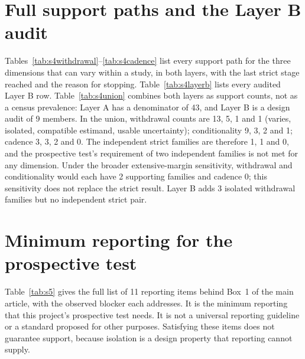 \documentclass[11pt]{article}
\begin{document}
\begin{table}[ht]
\centering\small
\caption{Where key designs stop (former main Table~3). One row per dimension--design entry: isolated family--dimension entries and two bundled key comparators. Isolation, estimand and uncertainty are the codes of the focal comparison; ``Stops at'' is the first strict stage not passed.}\label{tab:s3}
\resizebox{\textwidth}{!}{}
\end{table}



\section{Full support paths and the Layer B audit}

Tables~\ref{tab:s4withdrawal}--\ref{tab:s4cadence} list every support path for the three dimensions that can vary within a study, in both layers, with the last strict stage reached and the reason for stopping. Table~\ref{tab:s4layerb} lists every audited Layer B row. Table~\ref{tab:s4union} combines both layers as support counts, not as a census prevalence: Layer A has a denominator of 43, and Layer B is a design audit of 9 members. %
In the union, withdrawal counts are 13, 5, 1 and 1 (varies, isolated, compatible estimand, usable uncertainty); conditionality 9, 3, 2 and 1; cadence 3, 3, 2 and 0. The independent strict families are therefore 1, 1 and 0, and the prospective test's requirement of two independent families is not met for any dimension. Under the broader extensive-margin sensitivity, withdrawal and conditionality would each have 2 supporting families and cadence 0; this sensitivity does not replace the strict result. Layer B adds 3 isolated withdrawal families but no independent strict pair. %

\begin{landscape}




\end{landscape}


\section{Minimum reporting for the prospective test}

Table~\ref{tab:s5} gives the full list of 11 reporting items behind Box~1 of the main article, with the observed blocker each addresses. It is the minimum reporting that this project's prospective test needs. It is not a universal reporting guideline or a standard proposed for other purposes. Satisfying these items does not guarantee support, because isolation is a design property that reporting cannot supply. %
\end{document}

